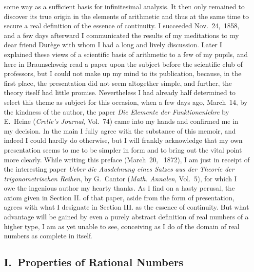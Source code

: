 \documentclass[polutonikogreek,english,twoside,openright]{article}
\begin{document}
some way as a sufficient basis for infinitesimal analysis. It then
only remained to discover its true origin in the elements of
arithmetic and thus at the same time to secure a real definition of
the essence of continuity. I succeeded Nov.\ 24,\ 1858, and a few days
afterward I communicated the results of my meditations to my dear
friend Durège with whom I had a long and lively discussion. Later I
explained these views of a scientific basis of arithmetic to a few of
my pupils, and here in Braunschweig read a paper upon the subject
before the scientific club of professors, but I could not make up my
mind to its publication, because, in the first place, the presentation
did not seem altogether simple, and further, the theory itself had
little promise. Nevertheless I had already half determined to select
this theme as subject for this occasion, when a few days ago,
March~14, by the kindness of the author, the paper \textit{Die
  Elemente der Funktionenlehre} by E.~Heine (\textit{Crelle's
  Journal}, Vol.~74) came into my hands and confirmed me in my
decision. In the main I fully agree with the substance of this memoir,
and indeed I could hardly do otherwise, but I will frankly acknowledge
that my own presentation seems to me to be simpler in form and to
bring out the vital point more clearly. While writing this preface
(March~20,~%
1872), I am just in receipt of the interesting paper \textit{Ueber die
  Ausdehnung eines Satzes aus der Theorie der trigonometrischen
  Reihen}, by G.~Cantor (\textit{Math. Annalen}, Vol.~5), for which I
owe the ingenious author my hearty thanks. As I find on a hasty
perusal, the axiom given in Section II. of that paper, aside from the
form of presentation, agrees with what I designate in Section III. as
the essence of continuity. But what advantage will be gained by even a
purely abstract definition of real numbers of a higher type, I am as
yet unable to see, conceiving as I do of the domain of real numbers as
complete in itself.\label{prefaceend}

\subsection*{I.\ Properties of Rational Numbers}
\end{document}
